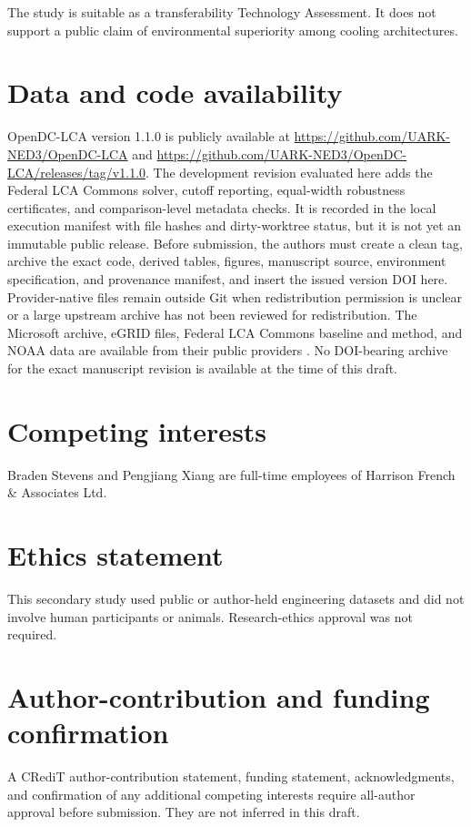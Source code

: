 \documentclass[review,12pt]{elsarticle}
\begin{document}
The study is suitable as a transferability Technology Assessment. It does not support a public claim of environmental superiority among cooling architectures.

\section{Data and code availability}
OpenDC-LCA version 1.1.0 is publicly available at \url{https://github.com/UARK-NED3/OpenDC-LCA} and \url{https://github.com/UARK-NED3/OpenDC-LCA/releases/tag/v1.1.0}. The development revision evaluated here adds the Federal LCA Commons solver, cutoff reporting, equal-width robustness certificates, and comparison-level metadata checks. It is recorded in the local execution manifest with file hashes and dirty-worktree status, but it is not yet an immutable public release. Before submission, the authors must create a clean tag, archive the exact code, derived tables, figures, manuscript source, environment specification, and provenance manifest, and insert the issued version DOI here. Provider-native files remain outside Git when redistribution permission is unclear or a large upstream archive has not been reviewed for redistribution. The Microsoft archive, eGRID files, Federal LCA Commons baseline and method, and NOAA data are available from their public providers \cite{ref15,ref40,ref41,ref42,ref45}. No DOI-bearing archive for the exact manuscript revision is available at the time of this draft.

\section{Competing interests}
Braden Stevens and Pengjiang Xiang are full-time employees of Harrison French \& Associates Ltd.

\section{Ethics statement}
This secondary study used public or author-held engineering datasets and did not involve human participants or animals. Research-ethics approval was not required.

\section{Author-contribution and funding confirmation}
A CRediT author-contribution statement, funding statement, acknowledgments, and confirmation of any additional competing interests require all-author approval before submission. They are not inferred in this draft.
\end{document}
